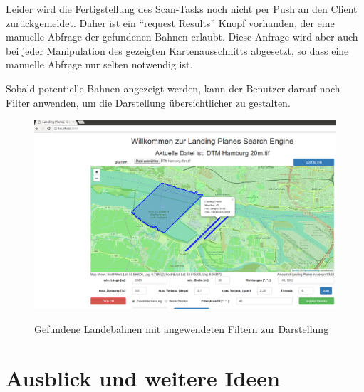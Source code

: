 \documentclass[10pt,a4paper]{report}
\begin{document}
Leider wird die Fertigstellung des Scan-Tasks noch nicht per Push an den Client zurückgemeldet. Daher ist ein "`request Results"' Knopf vorhanden, der eine manuelle Abfrage der gefundenen Bahnen erlaubt. Diese Anfrage wird aber auch bei jeder Manipulation des gezeigten Kartenausschnitts abgesetzt, so dass eine manuelle Abfrage nur selten notwendig ist.

Sobald potentielle Bahnen angezeigt werden, kann der Benutzer darauf noch Filter anwenden, um die Darstellung übersichtlicher zu gestalten.

\begin{figure}[ht]
	\includegraphics[width=\textwidth]{./drawings/LandingClient_Screen_Planes.png}
	\label{dargestellte_bahnen}
	\caption{Gefundene Landebahnen mit angewendeten Filtern zur Darstellung}
\end{figure}

\chapter{Ausblick und weitere Ideen}
\end{document}
